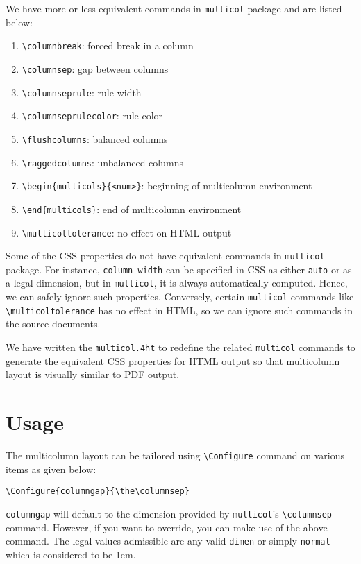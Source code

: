 \documentclass{article}
\begin{document}
We have more or less equivalent commands in \texttt{multicol} package and
are listed below:

\begin{enumerate}
\item \texttt{\textbackslash{}columnbreak}: forced break in a column
\item \texttt{\textbackslash{}columnsep}: gap between columns
\item \texttt{\textbackslash{}columnseprule}: rule width
\item \texttt{\textbackslash{}columnseprulecolor}: rule color
\item \texttt{\textbackslash{}flushcolumns}: balanced columns
\item \texttt{\textbackslash{}raggedcolumns}: unbalanced columns
\item \texttt{\textbackslash{}begin\{multicols\}\{<num>\}}: beginning of
        multicolumn environment
\item \texttt{\textbackslash{}end\{multicols\}}: end of multicolumn environment
\item \texttt{\textbackslash{}multicoltolerance}: no effect on HTML output
\end{enumerate}

Some of the CSS properties do not have equivalent commands in
\texttt{multicol} package. For instance, \texttt{column-width} can be
specified in CSS as either \texttt{auto} or as a legal dimension, but
in \texttt{multicol}, it is always automatically computed. Hence, we
can safely ignore such properties. Conversely, certain
\texttt{multicol} commands like
\texttt{\textbackslash{}multicoltolerance} has no effect in HTML, so
we can ignore such commands in the source documents.

We have written the \texttt{multicol.4ht} to redefine the related
\texttt{multicol} commands to generate the equivalent CSS properties
for HTML output so that multicolumn layout is visually similar to PDF
output.

\section*{Usage}
\label{sec-3}

The multicolumn layout can be tailored using
\texttt{\textbackslash{}Configure} command on various items as given
below:

\begin{verbatim}
\Configure{columngap}{\the\columnsep}
\end{verbatim}
\texttt{columngap} will default to the dimension provided by
\texttt{multicol}'s \texttt{\textbackslash{}columnsep}
command. However, if you want to override, you can make use of the
above command. The legal values admissible are any valid
\texttt{dimen} or simply \texttt{normal} which is considered to be
1em.
\end{document}
